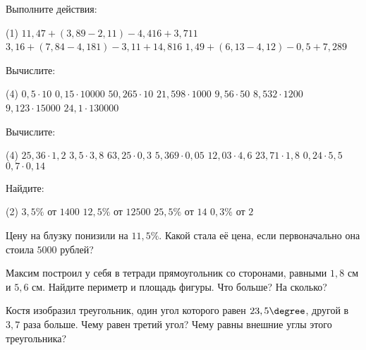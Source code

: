 %
%

\begin{class}[number=1]
	\begin{listofex}
		\item Выполните действия:
		\begin{tasks}(1)
			\task \( 11,47+(3,89-2,11)-4,416+3,711 \)
			\task \( 3,16+(7,84-4,181)-3,11+14,816 \)
			\task \( 1,49+(6,13-4,12)-0,5+7,289 \)
		\end{tasks}
		\item Вычислите:
		\begin{tasks}(4)
			\task \( 0,5\cdot10 \)
			\task \( 0,15\cdot10000 \)
			\task \( 50,265\cdot10 \)
			\task \( 21,598\cdot1000 \)
			\task \( 9,56\cdot50 \)
			\task \( 8,532\cdot1200 \)
			\task \( 9,123\cdot15000 \)
			\task \( 24,1\cdot130000 \)
		\end{tasks}
		\item Вычислите:
		\begin{tasks}(4)
			\task \( 25,36\cdot1,2 \)
			\task \( 3,5\cdot3,8 \)
			\task \( 63,25\cdot0,3 \)
			\task \( 5,369\cdot0,05 \)
			\task \( 12,03\cdot4,6 \)
			\task \( 23,71\cdot1,8 \)
			\task \( 0,24\cdot5,5 \)
			\task \( 0,7\cdot0,14 \)
		\end{tasks}
		\item Найдите:
		\begin{tasks}(2)
			\task \( 3,5\% \) от \( 1400 \)
			\task \( 12,5\% \) от \( 12500 \)
			\task \( 25,5\% \) от \( 14 \)
			\task \( 0,3\% \) от \( 2 \)
		\end{tasks}
		\item Цену на блузку понизили на \( 11,5\% \). Какой стала её цена, если первоначально она стоила \( 5000 \) рублей?
		\item Максим построил у себя в тетради прямоугольник со сторонами, равными \( 1,8 \) см и \( 5,6 \) см. Найдите периметр и площадь фигуры. Что больше? На сколько?
		\item Костя изобразил треугольник, один угол которого равен \( 23,5\degree \), другой в \( 3,7 \) раза больше. Чему равен третий угол? Чему равны внешние углы этого треугольника?
	\end{listofex}
\end{class}

